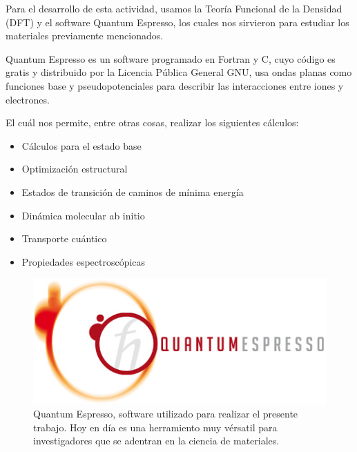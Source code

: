 
Para el desarrollo de esta actividad, usamos la Teoría Funcional de la Densidad (DFT)
y el software Quantum Espresso, los cuales nos sirvieron para estudiar los materiales
previamente mencionados.

Quantum Espresso es un software programado en Fortran y C, cuyo código es gratis y distribuido por la Licencia
Pública General GNU, usa ondas planas como funciones base y pseudopotenciales para describir las 
interacciones entre iones y electrones. \cite{WinNT}

\vspace{0.5cm}

El cuál nos permite, entre otras cosas, realizar los siguientes cálculos: \cite{WinNT}

\begin{itemize}
    \item Cálculos para el estado base
    \item Optimización estructural 
    \item Estados de transición de caminos de mínima energía
    \item Dinámica molecular ab initio
    \item Transporte cuántico
    \item Propiedades espectroscópicas
\end{itemize}

\vspace{1cm}

\begin{figure}[H]
    \centering
    \includegraphics[scale=0.5]{logo_header.jpg}
    \caption{Quantum Espresso, software utilizado para realizar el presente trabajo. Hoy en día 
             es una herramiento muy vérsatil para investigadores que se adentran en la ciencia 
             de materiales.}
\end{figure}

\newpage
